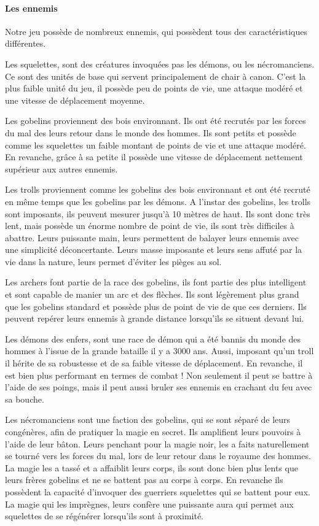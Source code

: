 \documentclass[a4paper, 12pt]{article}
\begin{document}
			\paragraph{Les ennemis}
			Notre jeu possède de nombreux ennemis, qui possèdent tous des caractéristiques différentes.
\par Les squelettes, sont des créatures invoquées pas les démons, ou les nécromanciens. Ce sont des unités de base qui servent principalement de chair à canon. C’est la plus faible unité du jeu, il possède peu de points de vie, une attaque modéré et une vitesse de déplacement moyenne.
\par Les gobelins proviennent des bois environnant. Ils ont été recrutés par les forces du mal des leurs retour dans le monde des hommes. Ils sont petits et possède comme les squelettes un faible montant de points de vie et une attaque modéré. En revanche, grâce à sa petite il possède une vitesse de déplacement nettement supérieur aux autres ennemis.
\par Les trolls proviennent comme les gobelins des bois environnant et ont été recruté en même temps que les gobelins par les démons. A l’instar des gobelins, les trolls sont imposants, ils peuvent mesurer jusqu’à 10 mètres de haut. Ils sont donc très lent, mais possède un énorme nombre de point de vie, ils sont très difficiles à abattre. Leurs puissante main, leurs permettent de balayer leurs ennemis avec une simplicité déconcertante. Leurs masse imposante et leurs sens affuté par la vie dans la nature, leurs permet d’éviter les pièges au sol.
\par Les archers font partie de la race des gobelins, ils font partie des plus intelligent et sont capable de manier un arc et des flèches. Ils sont légèrement plus grand que les gobelins standard et possède plus de point de vie de que ces derniers. Ils peuvent repérer leurs ennemis à grande distance lorsqu’ils se situent devant lui.
\par Les démons des enfers, sont une race de démon qui a été bannis du monde des hommes à l’issue de la grande bataille il y a 3000 ans. Aussi, imposant qu’un troll il hérite de sa robustesse et de sa faible vitesse de déplacement. En revanche, il est bien plus performant en termes de combat ! Non seulement il peut se battre à l’aide de ses poings, mais il peut aussi bruler ses ennemis en crachant du feu avec sa bouche.
\par Les nécromanciens sont une faction des gobelins, qui se sont séparé de leurs congénères, afin de pratiquer la magie en secret. Ils amplifient leurs pouvoirs à l’aide de leur bâton. Leurs penchant pour la magie noir, les a faits naturellement se tourné vers les forces du mal, lors de leur retour dans le royaume des hommes. La magie les a tassé et a affaiblit leurs corps, ils sont donc bien plus lents que leurs frères gobelins et ne se battent pas au corps à corps. En revanche ils possèdent la capacité d’invoquer des guerriers squelettes qui se battent pour eux. La magie qui les imprègnes, leurs confère une puissante aura qui permet aux squelettes de se régénérer lorsqu’ils sont à proximité.
\end{document}
